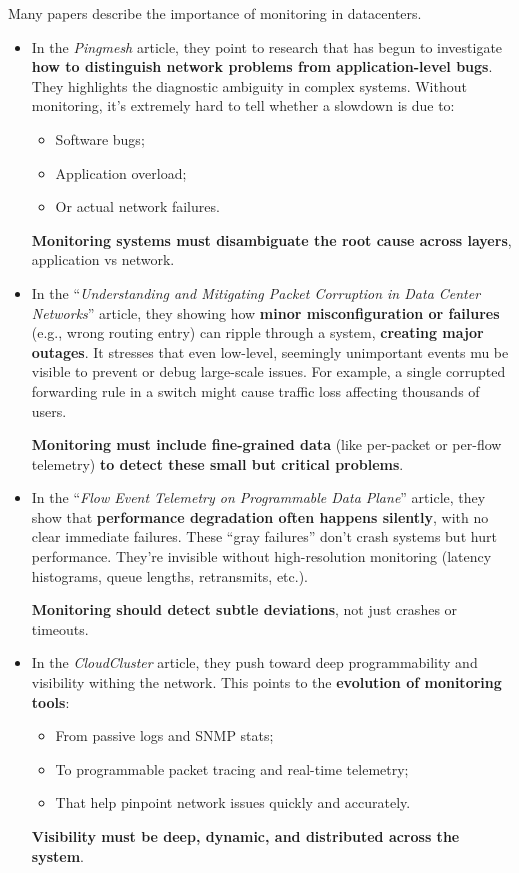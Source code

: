 \highspace
Many papers describe the importance of monitoring in datacenters.
\begin{itemize}
    \item In the \emph{Pingmesh}\cite{10.1145/2829988.2787496} article, they point to research that has begun to investigate \textbf{how to distinguish network problems from application-level bugs}. They highlights the diagnostic ambiguity in complex systems. Without monitoring, it's extremely hard to tell whether a slowdown is due to:
    \begin{itemize}
        \item Software bugs;
        \item Application overload;
        \item Or actual network failures.
    \end{itemize}
    \textbf{Monitoring systems must disambiguate the root cause across layers}, application vs network.


    \item In the ``\emph{Understanding and Mitigating Packet Corruption in Data Center Networks}''\cite{10.1145/3098822.3098849} article, they showing how \textbf{minor misconfiguration or failures} (e.g., wrong routing entry) can ripple through a system, \textbf{creating major outages}. It stresses that even low-level, seemingly unimportant events mu be visible to prevent or debug large-scale issues. For example, a single corrupted forwarding rule in a switch might cause traffic loss affecting thousands of users.

    \textbf{Monitoring must include fine-grained data} (like per-packet or per-flow telemetry) \textbf{to detect these small but critical problems}.


    \item In the ``\emph{Flow Event Telemetry on Programmable Data Plane}''\cite{10.1145/3387514.3406214} article, they show that \textbf{performance degradation often happens silently}, with no clear immediate failures. These ``gray failures'' don't crash systems but hurt performance. They're invisible without high-resolution monitoring (latency histograms, queue lengths, retransmits, etc.).
    
    \textbf{Monitoring should detect subtle deviations}, not just crashes or timeouts.


    \item In the \emph{CloudCluster}\cite{276948} article, they push toward deep programmability and visibility withing the network. This points to the \textbf{evolution of monitoring tools}:
    \begin{itemize}
        \item From passive logs and SNMP stats;
        \item To programmable packet tracing and real-time telemetry;
        \item That help pinpoint network issues quickly and accurately.
    \end{itemize}
    \textbf{Visibility must be deep, dynamic, and distributed across the system}.
\end{itemize}
